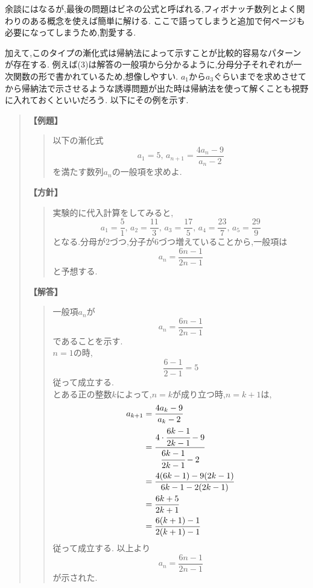 \documentclass[dvipdfmx,a4paper,11pt,fleqn,openany]{jsbook}
\renewcommand{\qed}{\unskip\nobreak\quad\qedsymbol}
\begin{document}
    余談にはなるが,最後の問題はビネの公式と呼ばれる,フィボナッチ数列とよく関わりのある概念を使えば簡単に解ける.
    ここで語ってしまうと追加で何ページも必要になってしまうため,割愛する.

    加えて,このタイプの漸化式は帰納法によって示すことが比較的容易なパターンが存在する.
    例えば(3)は解答の一般項から分かるように,分母分子それぞれが一次関数の形で書かれているため,想像しやすい.
    $a_1$から$a_3$ぐらいまでを求めさせてから帰納法で示させるような誘導問題が出た時は帰納法を使って解くことも視野に入れておくといいだろう.
    以下にその例を示す.
    \begin{quote}
      \textbf{【例題】}
      \begin{quote}
        以下の漸化式
        \[
          a_1=5,\, a_{n+1}=\dfrac{4a_{n}-9}{a_{n}-2}
        \]
        を満たす数列$a_n$の一般項を求めよ.
      \end{quote}
      \textbf{【方針】}
      \begin{quote}
        実験的に代入計算をしてみると,
        \[
          a_1=\frac{5}{1},\,a_2=\frac{11}{3},\,a_3=\frac{17}{5},\,a_4=\frac{23}{7},\,a_5=\frac{29}{9}
        \]
        となる.分母が2づつ,分子が6づつ増えていることから,一般項は
        \[
          a_n=\frac{6n-1}{2n-1}
        \]
        と予想する.
      \end{quote}
      \textbf{【解答】}
      \begin{quote}
        一般項$a_n$が
        \[
          a_n=\frac{6n-1}{2n-1}
        \]
        であることを示す.\\
        $n=1$の時,
        \[
          \frac{6-1}{2-1}=5
        \]
        従って成立する.\\
        とある正の整数$k$によって,$n=k$が成り立つ時,$n=k+1$は,
        \begin{align*}
          a_{k+1}&=\frac{4a_{k}-9}{a_{k}-2}\\
          &=\cfrac{4\cdot \cfrac{6k-1}{2k-1}-9}{\cfrac{6k-1}{2k-1}-2}\\
          &=\frac{4(6k-1)-9(2k-1)}{6k-1-2(2k-1)}\\
          &=\frac{6k+5}{2k+1}\\
          &=\frac{6(k+1)-1}{2(k+1)-1}
        \end{align*}
        従って成立する.
        以上より
        \[
          a_n=\frac{6n-1}{2n-1}
        \]
        が示された.\qed
      \end{quote}


    \end{quote}
\end{document}
